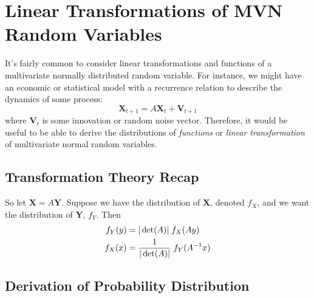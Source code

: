 \documentclass[a4paper,12pt]{scrartcl}
\begin{document}
\section{Linear Transformations of MVN Random Variables}

It's fairly common to consider linear transformations and functions
of a multivariate normally distributed random variable.  For instance,
we might have an economic or statistical model with a recurrence 
relation to describe the dynamics of some process:
\[ \mathbf{X}_{t+1} = A \mathbf{X}_{t} + \mathbf{V}_{t+1} \]
where $\mathbf{V}_t$ is some innovation or random noise vector.
Therefore, it would be useful to be able to derive the distributions
of \emph{functions} or \emph{linear transformation} of multivariate 
normal random variables.

\subsection{Transformation Theory Recap}

So let $\mathbf{X} = A\mathbf{Y}$. Suppose we have the distribution of
$\mathbf{X}$, denoted $f_{{X}}$, and we want the distribution
of $\mathbf{Y}$, $f_{{Y}}$. Then
\begin{align}
    f_{{Y}}(y) &= |\det(A)| \; f_{{X}}(Ay) \notag \\
    f_{{X}}(x) &= \frac{1}{|\det(A)|} \; f_{{Y}}(A^{-1} x) 
	\label{trans}
\end{align}

\newpage
\subsection{Derivation of Probability Distribution}
\end{document}
